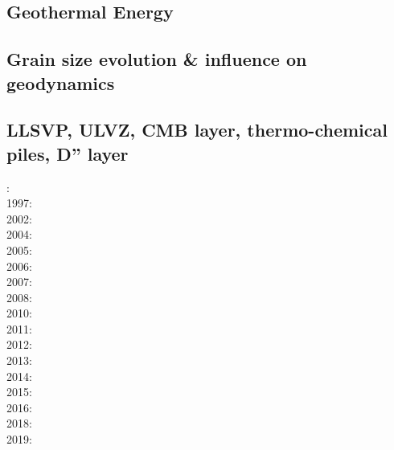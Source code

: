 \cite{davi84}\cite{hage84}
\cite{davi86}
\cite{zhgu92}\cite{kiha92}
\cite{zhch93}\cite{rirl93}
\cite{kiha94}
\cite{king95}\cite{mopa95}
\cite{mogu96}
\cite{cava98}\cite{chki98}
\cite{meco08}
\cite{king09}
\cite{ghbz10}\cite{spgs10b}
\cite{hibi12}
\cite{lizh15}
\cite{grab17}
\cite{king18}

\subsection*{Geothermal Energy} 

\cite{quxm15}
\cite{revf19}

\subsection*{Grain size evolution \& influence on geodynamics}

\cite{brcp99}
\cite{dets01}
\cite{soet02}
\cite{hapa03}
\cite{rorb11}
\cite{beri13}
\cite{besr14}
\cite{thrk15}\cite{tukb15}\cite{pevp15}
\cite{ceww17}\cite{daef17}\cite{mube17}
\cite{bemu18}\cite{bezb18}\cite{mube18}


\subsection*{LLSVP, ULVZ, CMB layer, thermo-chemical piles, D'' layer}

: \cite{dagu86}\\
1997: \cite{kell97}\\
2002: \cite{somo02}\\
2004: \cite{mczh04}\cite{nata04}\\
2005: \cite{mczh05a}\\
2006: \cite{nata06}\\
2007: \cite{heta07}\\
2008: \cite{gamc08}\cite{nata08}\\
2010: \cite{stto10}\cite{mcgr10}\cite{nata10}\\
2011: \cite{bowg11}\cite{talz11}\\
2012: \cite{stto12}\cite{dagd12}\cite{dect12}\\
2013: \cite{limc13}\cite{bogs13a}\cite{bogs13b}\\
2014: \cite{budt14}\cite{lidt14}\cite{tovd14}\\
2015: \cite{musd15}\cite{hafg15}\cite{delt15}\\
2016: \cite{dost16}\cite{tosa16}\\
2018: \cite{daga18}\cite{lizo18}\cite{hect18}\\
2019: \cite{hebo19}


